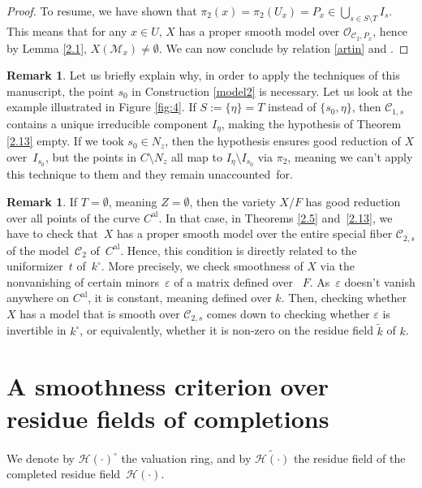\documentclass[JEP,XML,SOM,Unicode,NoFloatCountersInSection,published]{cedram}
\newcommand{\al}{\mathrm{al}}
\let\backslash\setminus
\let\epsilon\varepsilon
\theoremstyle{definition}
\newtheorem{rem}[thm]{Remark}
\begin{document}
\begin{proof}
To resume, we have shown that $\pi_2(x)=\pi_2(U_x)=P_x \in \bigcup_{s \in S \backslash T} I_s$. This means that for any $x \in U$, $X$ has a proper smooth model over $\mathcal{O}_{\mathscr{C}_2, P_x}$, hence by Lemma \ref{2.1}, $X(\mathscr{M}_x) \neq \emptyset$. We can now conclude by relation \eqref{artin} and \cite[Cor.\,3.18]{une}.
\end{proof}

\begin{rem}\label{2.14}
Let us briefly explain why, in order to apply the techniques of this manuscript, the point $s_0$ in Construction \ref{model2} is necessary. Let us look at the example illustrated in Figure \ref{fig:4}. If $S:=\{\eta\}=T$ instead of $\{s_0, \eta\}$, then $\mathscr{C}_{1,s}$ contains a unique irreducible component $I_{\eta}$, making the hypothesis of Theorem \ref{2.13} empty. If we took $s_0 \in N_{z}$, then the hypothesis ensures good reduction of $X$ over~$I_{s_0}$, but the points in $C \backslash N_z$ all map to $I_{\eta} \backslash I_{s_0}$ via $\pi_2$, meaning we can't apply this technique to them and they remain unaccounted~for.
\end{rem}

\begin{rem} \label{2.17}
If $T=\emptyset$, meaning $Z=\emptyset$, then the variety $X/F$ has good reduction over all points of the curve $C^{\al}$. In that case, in Theorems \ref{2.5} and~\ref{2.13}, we have to check that~$X$ has a proper smooth model over the entire special fiber $\mathscr{C}_{2,s}$ of the model~$\mathscr{C}_2$ of~$C^{\al}$. Hence, this condition is directly related to the uniformizer~$t$ of~$k^{\circ}$. More precisely, we check smoothness of $X$ via the nonvanishing of certain minors~$\epsilon$ of a matrix defined over ~$F$. As~$\epsilon$ doesn't vanish anywhere on $C^{\al}$, it is constant, meaning defined over $k$. Then, checking whether $X$ has a model that is smooth over $\mathscr{C}_{2,s}$ comes down to checking whether $\epsilon$ is invertible in $k^{\circ}$, or equivalently, whether it is non-zero on the residue field $\widetilde{k}$ of $k$.
\end{rem}

\section{A smoothness criterion over residue fields of completions} \label{seksioni3}

We denote by $\mathcal{H}(\cdot)^{\circ}$ the valuation ring, and by $\widetilde{\mathcal{H}(\cdot)}$ the residue field of the completed residue field~$\mathcal{H}(\cdot)$.
\end{document}
